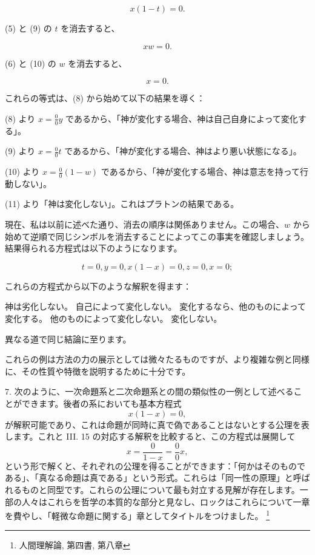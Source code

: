 \documentclass[a4paper,11pt,openany]{ltjsbook}
\begin{document}
\begin{equation}
     x(1-t) = 0.
\end{equation}

(5) と (9) の $t$ を消去すると、

\begin{equation}
     xw = 0.
\end{equation}

(6) と (10) の $w$ を消去すると、

\begin{equation}
     x = 0.
\end{equation}

これらの等式は、(8) から始めて以下の結果を導く：

(8) より $x = \frac{0}{0}y$ であるから、「神が変化する場合、神は自己自身によって変化する」。

(9) より $x = \frac{0}{0}t$ であるから、「神が変化する場合、神はより悪い状態になる」。

(10) より $x = \frac{0}{0}(1-w)$ であるから、「神が変化する場合、神は意志を持って行動しない」。

(11) より「神は変化しない」。これはプラトンの結果である。

現在、私は以前に述べた通り、消去の順序は関係ありません。この場合、$w$ から始めて逆順で同じシンボルを消去することによってこの事実を確認しましょう。結果得られる方程式は以下のようになります。

\[
t=0, y = 0, x(1-x) = 0, z = 0, x = 0;
\]

これらの方程式から以下のような解釈を得ます：

神は劣化しない。
自己によって変化しない。
変化するなら、他のものによって変化する。
他のものによって変化しない。
変化しない。

異なる道で同じ結論に至ります。

これらの例は方法の力の展示としては微々たるものですが、より複雑な例と同様に、その性質や特徴を説明するために十分です。

7. 次のように、一次命題系と二次命題系との間の類似性の一例として述べることができます。後者の系においても基本方程式
\[
x(1 - x) = 0,
\]
が解釈可能であり、これは命題が同時に真で偽であることはないとする公理を表します。これと III. 15 の対応する解釈を比較すると、この方程式は展開して
\[
x=\frac{0}{1-x}=\frac{0}{0}x,
\]
という形で解くと、それぞれの公理を得ることができます：「何かはそのものである」、「真なる命題は真である」という形式。これらは「同一性の原理」と呼ばれるものと同型です。これらの公理について最も対立する見解が存在します。一部の人々はこれらを哲学の本質的な部分と見なし、ロックはこれらについて一章を費やし、「軽微な命題に関する」章としてタイトルをつけました。
\footnote{人間理解論, 第四書, 第八章}
\end{document}
